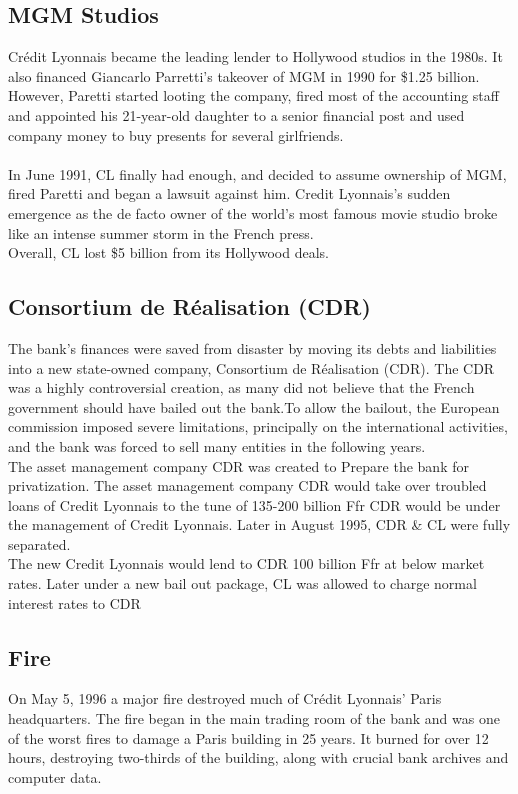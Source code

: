 \documentclass[12pt, a4paper]{report}
\begin{document}
\subsection{MGM Studios}
Crédit Lyonnais became the leading lender to Hollywood studios in
the 1980s. It also financed Giancarlo Parretti's takeover of MGM
in 1990 for \$1.25 billion. However, Paretti started looting the
company, fired most of the accounting staff and appointed his
21-year-old daughter to a senior financial post and used company
money to buy presents for several girlfriends.\\\\In June 1991, CL
finally had enough, and decided to assume ownership of MGM, fired
Paretti and began a lawsuit against him. Credit Lyonnais's sudden
emergence as the de facto owner of the world's most famous movie
studio broke like an intense summer storm in the French
press.\\Overall, CL lost \$5 billion from its Hollywood deals.

\subsection{Consortium de Réalisation (CDR)}
The bank's finances were saved from disaster by moving its debts
and liabilities into a new state-owned company, Consortium de
Réalisation (CDR). The CDR was a highly controversial creation, as
many did not believe that the French government should have bailed
out the bank.To allow the bailout, the European commission imposed
severe limitations, principally on the international activities,
and the bank was forced to sell many entities in the following
years.
\\
The asset management company CDR was created to Prepare the bank
for privatization. The asset management company CDR would take
over troubled loans of Credit Lyonnais to the tune of 135-200
billion Ffr CDR would be under the management of Credit Lyonnais.
Later in August 1995, CDR \& CL were fully separated.
\\
 The new Credit Lyonnais would lend to CDR 100 billion Ffr at below market rates. Later under a new bail out package,
CL was allowed to charge normal interest rates to CDR

\subsection{Fire}
On May 5, 1996 a major fire destroyed much of Crédit Lyonnais'
Paris headquarters. The fire began in the main trading room of the
bank and was one of the worst fires to damage a Paris building in
25 years. It burned for over 12 hours, destroying two-thirds of
the building, along with crucial bank archives and computer data.
\end{document}
